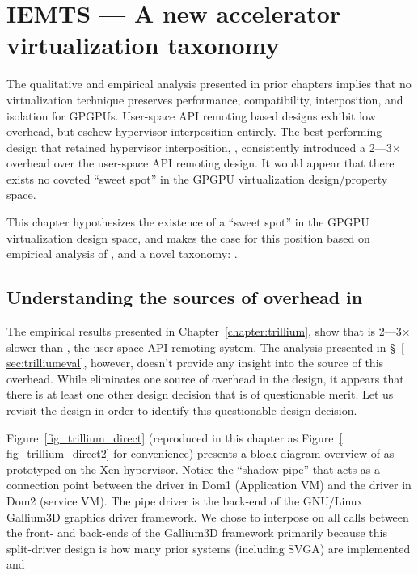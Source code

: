 \chapter{IEMTS --- A new accelerator virtualization taxonomy}
\label{chapter:iemts}


The qualitative and empirical analysis presented in prior chapters implies
that no virtualization technique preserves performance, compatibility,
interposition, and isolation for GPGPUs. User-space API remoting based designs
exhibit low overhead, but eschew hypervisor interposition entirely. The best
performing design that retained hypervisor interposition, \Trillium,
consistently introduced a 2---3$\times$ overhead over the user-space API
remoting design. It would appear that there exists no coveted ``sweet spot''
in the GPGPU virtualization design/property space.

This chapter hypothesizes the existence of a ``sweet spot'' in the GPGPU
virtualization design space, and makes the case for this position based on
empirical analysis of \Trillium, and a novel taxonomy: \iemts.

\section{Understanding the sources of overhead in \Trillium}
The empirical results presented in Chapter~\ref{chapter:trillium},
show that \Trillium is 2---3$\times$ slower than \apigpu,
the user-space API remoting system. The analysis presented in \S~\ref{
sec:trilliumeval}, however, doesn't provide any insight into the source of
this overhead. While \Trillium eliminates one source of overhead in the
\XenSVGA design, it appears that there is at least one other design decision
that is of questionable merit. Let us revisit the \Trillium design in order to
identify this questionable design decision.

Figure~\ref{fig_trillium_direct} (reproduced in this chapter as Figure~\ref{
fig_trillium_direct2} for convenience) presents a block diagram overview of
\Trillium as prototyped on the Xen hypervisor. Notice the ``shadow pipe'' that
acts as a connection point between the driver in Dom1 (Application VM) and the
driver in Dom2 (service VM). The pipe driver is the back-end of the GNU/Linux
Gallium3D graphics driver framework. We chose to interpose on all calls
between the front- and back-ends of the Gallium3D framework primarily because
this split-driver design is how many prior systems (including SVGA) are
implemented and

